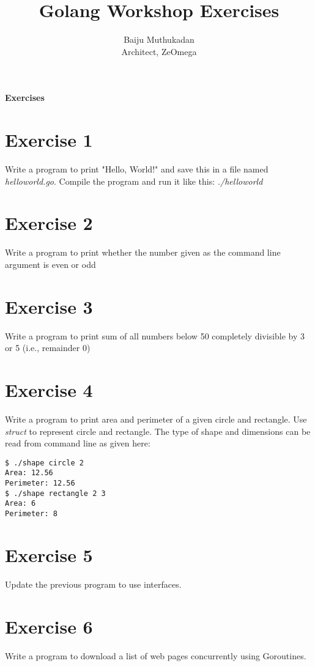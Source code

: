 \documentclass[11pt,a4paper]{article}
\title{\bf{Golang Workshop Exercises}}
\author{Baiju Muthukadan \\ Architect, ZeOmega}
\date{}
\begin{document}
\maketitle

\centerline{\LARGE\bf Exercises}
\section*{Exercise 1}
Write a program to print "Hello, World!" and save this in a
file named {\it helloworld.go}.  Compile the program and run
it like this: {\it./helloworld}

\section*{Exercise 2}
Write a program to print whether the number given as the command line
argument is even or odd

\section*{Exercise 3}
Write a program to print sum of all numbers below 50 completely
divisible by 3 or 5 (i.e., remainder 0)

\section*{Exercise 4}

Write a program to print area and perimeter of a given circle and
rectangle.  Use {\it struct} to represent circle and rectangle.  The
type of shape and dimensions can be read from command line as given
here:

\begin{verbatim}
$ ./shape circle 2
Area: 12.56
Perimeter: 12.56
$ ./shape rectangle 2 3
Area: 6
Perimeter: 8
\end{verbatim}

\section*{Exercise 5}

Update the previous program to use interfaces.

\section*{Exercise 6}

Write a program to download a list of web pages concurrently using
Goroutines.
\end{document}
